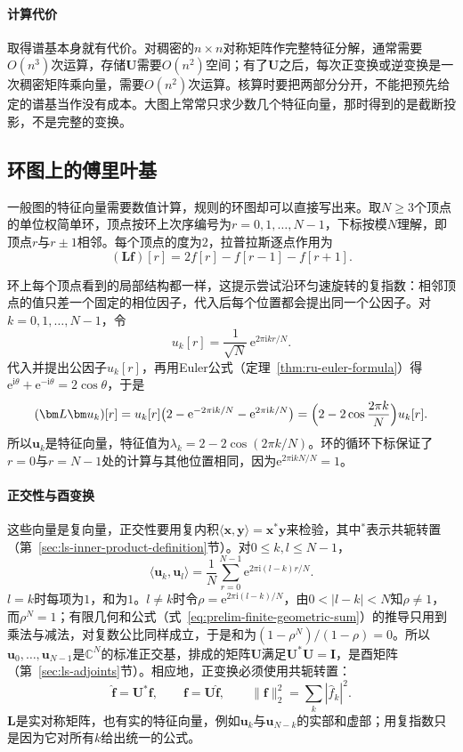 \paragraph{计算代价}
取得谱基本身就有代价。对稠密的$n\times n$对称矩阵作完整特征分解，通常需要$O(n^3)$次运算，存储$\bm U$需要$O(n^2)$空间；有了$\bm U$之后，每次正变换或逆变换是一次稠密矩阵乘向量，需要$O(n^2)$次运算。核算时要把两部分分开，不能把预先给定的谱基当作没有成本。大图上常常只求少数几个特征向量，那时得到的是截断投影，不是完整的变换。

\subsection{环图上的傅里叶基}
\label{sec:graph-spec-cycle-fourier-basis}

一般图的特征向量需要数值计算，规则的环图却可以直接写出来。取$N\geq3$个顶点的单位权简单环，顶点按环上次序编号为$r=0,1,\ldots,N-1$，下标按模$N$理解，即顶点$r$与$r\pm1$相邻。每个顶点的度为$2$，拉普拉斯逐点作用为
\[
 (\bm L\bm f)[r]=2f[r]-f[r-1]-f[r+1].
\]

环上每个顶点看到的局部结构都一样，这提示尝试沿环匀速旋转的复指数：相邻顶点的值只差一个固定的相位因子，代入后每个位置都会提出同一个公因子。对$k=0,1,\ldots,N-1$，令
\begin{equation}
 u_k[r]=\frac1{\sqrt N}\,\mathrm e^{2\pi\mathrm ikr/N}.
 \label{eq:graph-spec-cycle-eigenvector}
\end{equation}
代入并提出公因子$u_k[r]$，再用Euler公式（定理~\ref{thm:ru-euler-formula}）得$\mathrm e^{\mathrm i\theta}+\mathrm e^{-\mathrm i\theta}=2\cos\theta$，于是
\[
 (\bm L\bm u_k)[r]=u_k[r]\bigl(2-\mathrm e^{-2\pi\mathrm ik/N}-\mathrm e^{2\pi\mathrm ik/N}\bigr)
 =\Bigl(2-2\cos\frac{2\pi k}N\Bigr)u_k[r].
\]
所以$\bm u_k$是特征向量，特征值为$\lambda_k=2-2\cos(2\pi k/N)$。环的循环下标保证了$r=0$与$r=N-1$处的计算与其他位置相同，因为$\mathrm e^{2\pi\mathrm ikN/N}=1$。

\paragraph{正交性与酉变换}
这些向量是复向量，正交性要用复内积$\langle\bm x,\bm y\rangle=\bm x^*\bm y$来检验，其中$^*$表示共轭转置（第~\ref{sec:ls-inner-product-definition}节）。对$0\leq k,l\leq N-1$，
\[
 \langle\bm u_k,\bm u_l\rangle=\frac1N\sum_{r=0}^{N-1}\mathrm e^{2\pi\mathrm i(l-k)r/N}.
\]
$l=k$时每项为$1$，和为$1$。$l\neq k$时令$\rho=\mathrm e^{2\pi\mathrm i(l-k)/N}$，由$0<|l-k|<N$知$\rho\neq1$，而$\rho^N=1$；有限几何和公式（式~\eqref{eq:prelim-finite-geometric-sum}）的推导只用到乘法与减法，对复数公比同样成立，于是和为$(1-\rho^N)/(1-\rho)=0$。所以$\bm u_0,\ldots,\bm u_{N-1}$是$\mathbb C^N$的标准正交基，排成的矩阵$\bm U$满足$\bm U^*\bm U=\bm I$，是酉矩阵（第~\ref{sec:ls-adjoints}节）。相应地，正变换必须使用共轭转置：
\[
 \widehat{\bm f}=\bm U^*\bm f,\qquad \bm f=\bm U\widehat{\bm f},\qquad \lVert\bm f\rVert_2^2=\sum_k|\widehat f_k|^2 .
\]
$\bm L$是实对称矩阵，也有实的特征向量，例如$\bm u_k$与$\bm u_{N-k}$的实部和虚部；用复指数只是因为它对所有$k$给出统一的公式。

